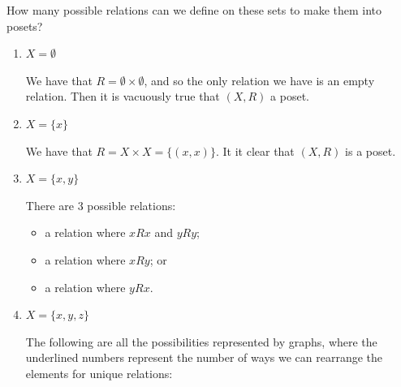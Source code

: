 \documentclass[notoc,notitlepage]{tufte-book}
\begin{document}
\begin{eg}\label{eg:number_of_posets}
  How many possible relations can we define on these sets to make them into posets?
  \begin{enumerate}
    \item $X = \emptyset$
      \begin{solution}
        We have that $R = \emptyset \times \emptyset$, and so the only relation we have is an empty relation. Then it is vacuously true that $(X, R)$ a poset.
      \end{solution}
    \item $X = \{ x \}$
      \begin{solution}
        We have that $R = X \times X = \{ ( x, x ) \}$. It it clear that $(X, R)$ is a poset.
      \end{solution}
    \item $X = \{ x, y \}$
      \begin{solution}
        There are 3 possible relations:
        \begin{itemize}
          \item a relation where $xRx$ and $yRy$;
          \item a relation where $xRy$; or
          \item a relation where $yRx$.
        \end{itemize}
      \end{solution}
    \item $X = \{ x, y, z \}$
      \begin{solution}
        The following are all the possibilities represented by graphs, where the underlined numbers represent the number of ways we can rearrange the elements for unique relations:


\end{solution}
\end{enumerate}
\end{eg}
\end{document}
